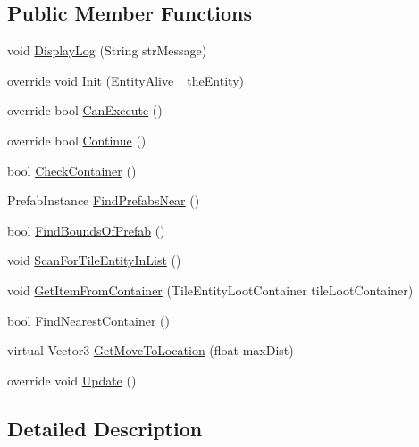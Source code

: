 \subsection*{Public Member Functions}
\begin{DoxyCompactItemize}
\item 
void \mbox{\hyperlink{class_e_a_i_loot_location_s_d_x_abdc9bb87714009f642ffd3bcc2ca02a5}{Display\+Log}} (String str\+Message)
\item 
override void \mbox{\hyperlink{class_e_a_i_loot_location_s_d_x_aed5f1ed4ec13c9bf492e947526c2df52}{Init}} (Entity\+Alive \+\_\+the\+Entity)
\item 
override bool \mbox{\hyperlink{class_e_a_i_loot_location_s_d_x_ae2c253e985cb45c5a41a43855aeef878}{Can\+Execute}} ()
\item 
override bool \mbox{\hyperlink{class_e_a_i_loot_location_s_d_x_aaa159c3b6aef2e88fdc2cf7a1cbf383a}{Continue}} ()
\item 
bool \mbox{\hyperlink{class_e_a_i_loot_location_s_d_x_a5018aba6f0aeae83dd36ec9f60dd6ce1}{Check\+Container}} ()
\item 
Prefab\+Instance \mbox{\hyperlink{class_e_a_i_loot_location_s_d_x_a797a04c2c771baa7785570beb13b39b7}{Find\+Prefabs\+Near}} ()
\item 
bool \mbox{\hyperlink{class_e_a_i_loot_location_s_d_x_adda31f1fe3bccc84780f4c2ba5f00532}{Find\+Bounds\+Of\+Prefab}} ()
\item 
void \mbox{\hyperlink{class_e_a_i_loot_location_s_d_x_a9a88913841b1fa33d45099935a0d5520}{Scan\+For\+Tile\+Entity\+In\+List}} ()
\item 
void \mbox{\hyperlink{class_e_a_i_loot_location_s_d_x_ab5d1353e4de2709ae5c3ea8997df4df6}{Get\+Item\+From\+Container}} (Tile\+Entity\+Loot\+Container tile\+Loot\+Container)
\item 
bool \mbox{\hyperlink{class_e_a_i_loot_location_s_d_x_ae5e22912ccbb99c0f38083b0dbe90bc4}{Find\+Nearest\+Container}} ()
\item 
virtual Vector3 \mbox{\hyperlink{class_e_a_i_loot_location_s_d_x_a0ae79f6b08ae9a0f467f06c6e160f50e}{Get\+Move\+To\+Location}} (float max\+Dist)
\item 
override void \mbox{\hyperlink{class_e_a_i_loot_location_s_d_x_a3fd754bcbfbbe83d865244da9ff53412}{Update}} ()
\end{DoxyCompactItemize}


\subsection{Detailed Description}


